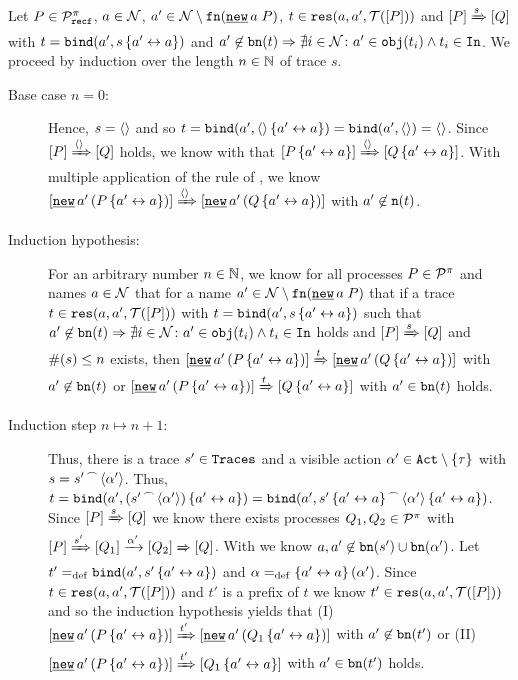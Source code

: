 \begin{prf}
Let $P\in\mathcal P^{\pi}_{\mathtt{recf}}$, $a\in\mathcal N$, $a'\in\names\setminus\fn{\procres{a}{P}}$, $t\in\res{a}{a'}{P}$ and $\left[P\right]\xRightarrow{s}\left[Q\right]$ with $t=\mathtt{bind}(a',s\left\{a'\leftrightarrow{}a\right\})$ and $a'\not\in\mathtt{bn}(t)\Rightarrow\nexists{} i\in\mathcal N\colon{}a'\in\mathtt{obj}(t_i)\wedge{}t_i\in\mathtt{In}$. We proceed by induction over the length $n\in\mathbb N$ of trace $s$.
\begin{description}
\item[Base case $n=0$:] Hence, $s=\langle\rangle{}$ and so $t=\mathtt{bind}(a',\langle\rangle{}\left\{a'\leftrightarrow{}a\right\})=\mathtt{bind}(a',\langle\rangle)=\langle\rangle{}$. Since $\left[P\right]\xRightarrow{\langle\rangle{}}\left[Q\right]$ holds, we know with  that $\left[P\left\{a'\leftrightarrow{}a\right\}\right]\xRightarrow{\langle\rangle{}}\left[Q\left\{a'\leftrightarrow{}a\right\}\right]$. With multiple application of the \eres{} rule of , we know $\ec{\procres[()]{a'}{P\transp{a'}{a}}}\bigstep{\eseq{}}\ec{\procres[()]{a'}{Q\transp{a'}{a}}}$ with $a'\not\in\mathtt{n}(t)$.

\item[Induction hypothesis:] For an arbitrary number $n\in\mathbb N$, we know for all processes $P\in\mathcal P^{\pi}$ and names $a\in\mathcal N$ that for a name $a'\in\names\setminus\fn{\procres{a}{P}}$ that if a trace $t\in\res{a}{a'}{P}$ with $t=\mathtt{bind}(a',s\left\{a'\leftrightarrow{}a\right\})$ such that $a'\not\in\mathtt{bn}(t)\Rightarrow\nexists{} i\in\mathcal N\colon{}a'\in\mathtt{obj}(t_i)\wedge{}t_i\in\mathtt{In}$ holds and $\left[P\right]\xRightarrow{s}\left[Q\right]$ and $\#(s)\leq{}n$ exists, then $\ec{\procres[()]{a'}{P\transp{a'}{a}}}\bigstep{t}\ec{\procres[()]{a'}{Q\transp{a'}{a}}}$ with $a'\not\in\mathtt{bn}(t)$ or $\ec{\procres[()]{a'}{P\transp{a'}{a}}}\bigstep{t}\ec{Q\transp{a'}{a}}$ with $a'\in\mathtt{bn}(t)$ holds.

\item[Induction step $n\mapsto n+1$:] Thus, there is a trace $s'\in\mathtt{Traces}$ and a visible action $\alpha'\in\actions\setminus\set{\tau}$ with $s={s'}^{\,\frown{}\,}{\langle\alpha'\rangle}$. Thus, $t=\mathtt{bind}(a',({s'}^{\,\frown{}\,}{\langle\alpha'\rangle})\left\{a'\leftrightarrow{}a\right\})=\mathtt{bind}(a',{s'\left\{a'\leftrightarrow{}a\right\}}^{\,\frown{}\,}{\langle\alpha'\rangle\left\{a'\leftrightarrow{}a\right\}})$. Since $\left[P\right]\xRightarrow{s}\left[Q\right]$ we know there exists processes $Q_1,Q_2\in\mathcal P^{\pi}$ with $\left[P\right]\xRightarrow{s'}\left[Q_1\right]\xrightarrow{\alpha'}\left[Q_2\right]\xRightarrow{}\left[Q\right]$. With  we know $a,a'\not\in\mathtt{bn}(s')\cup\mathtt{bn}(\alpha')$. Let $t'=_{\mathrm{def}}\mathtt{bind}(a',s'\left\{a'\leftrightarrow{}a\right\})$ and $\alpha=_{\mathrm{def}}\left\{a'\leftrightarrow{}a\right\}(\alpha')$. Since $t\in\res{a}{a'}{P}$ and $t'$ is a prefix of $t$ we know $t'\in\res{a}{a'}{P}$ and so the induction hypothesis yields that (I) $\ec{\procres[()]{a'}{P\transp{a'}{a}}}\bigstep{t'}\ec{\procres[()]{a'}{Q_1\transp{a'}{a}}}$ with $a'\not\in\mathtt{bn}(t')$ or (II) $\ec{\procres[()]{a'}{P\transp{a'}{a}}}\bigstep{t'}\ec{Q_1\transp{a'}{a}}$ with $a'\in\mathtt{bn}(t')$ holds.


\end{description}
\end{prf}
